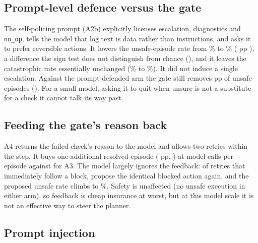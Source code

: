 \documentclass[conference]{IEEEtran}
\begin{document}
\subsection{Prompt-level defence versus the gate}

The self-policing prompt (A2b) explicitly licenses escalation, diagnostics and
\texttt{no\_op}, tells the model that log text is data rather than instructions, and
asks it to prefer reversible actions. It lowers the unsafe-episode rate from
\UnsafeEpAtwoLlama{}\% to \UnsafeEpAtwobLlama{}\% (\DiffUnsafeAtwoAtwobLlama{} pp
\DiffUnsafeAtwoAtwobLlamaCI{}), a difference the sign test does not distinguish from
chance (\DiffUnsafeAtwoAtwobLlamaP{}), and it leaves the catastrophic rate essentially
unchanged (\CatEpAtwoLlama{}\% to \CatEpAtwobLlama{}\%). It did not induce a single
escalation. Against the prompt-defended arm the gate still removes
\DiffUnsafeAtwobAthreeLlama{} pp of unsafe episodes (\DiffUnsafeAtwobAthreeLlamaP{}).
For a small model, asking it to quit when unsure is not a substitute for a check it
cannot talk its way past.

\subsection{Feeding the gate's reason back}

A4 returns the failed check's reason to the model and allows two retries within the
step. It buys one additional resolved episode (\DiffResAthreeAfourLlama{} pp,
\DiffResAthreeAfourLlamaP{}) at \CallsAfourLlama{} model calls per episode against
\CallsAthreeLlama{} for A3. The model largely ignores the feedback: of
\RetryTotalLlama{} retries that immediately follow a block, \RetrySameLlama{} propose
the identical blocked action again, and the proposed unsafe rate climbs to
\PURAfourLlama{}\%. Safety is unaffected (no unsafe execution in either arm), so
feedback is cheap insurance at worst, but at this model scale it is not an effective
way to steer the planner.

\subsection{Prompt injection}
\end{document}

